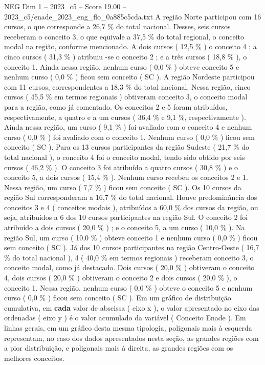 \begin{textsample}{NEG Dim 1 – 2023\_c5 – Score 19.00 – 2023\_c5/enade\_2023\_eng\_flo\_0a885c5cda.txt}
A região Norte participou com 16 cursos, o que corresponde a 26,7 \% do total nacional.
Desses, seis cursos receberam o conceito 3, o que equivale a 37,5 \% do total regional, o conceito modal na região, conforme mencionado.
A dois cursos ( 12,5 \% ) o conceito 4 ; a cinco cursos ( 31,3 \% ) atribuiu -se o conceito 2 ; e a três cursos ( 18,8 \% ), o conceito 1.
Ainda nessa região, nenhum curso ( 0,0 \% ) obteve conceito 5 e nenhum curso ( 0,0 \% ) ficou sem conceito ( SC ).
A região Nordeste participou com 11 cursos, correspondentes a 18,3 \% do total nacional.
Nessa região, cinco cursos ( 45,5 \% em termos regionais ) obtiveram conceito 3, o conceito modal para a região, como já comentado.
Os conceitos 2 e 5 foram atribuídos, respectivamente, a quatro e a um cursos ( 36,4 \% e 9,1 \%, respectivamente ).
Ainda nessa região, um curso ( 9,1 \% ) foi avaliado com o conceito 4 e nenhum curso ( 0,0 \% ) foi avaliado com o conceito 1.
Nenhum curso ( 0,0 \% ) ficou sem conceito ( SC ).
Para os 13 cursos participantes da região Sudeste ( 21,7 \% do total nacional ), o conceito 4 foi o conceito modal, tendo sido obtido por seis cursos ( 46,2 \% ).
O conceito 3 foi atribuído a quatro cursos ( 30,8 \% ) e o conceito 5, a dois cursos ( 15,4 \% ).
Nenhum curso recebeu os conceitos 2 e 1.
Nessa região, um curso ( 7,7 \% ) ficou sem conceito ( SC ).
Os 10 cursos da região Sul corresponderam a 16,7 \% do total nacional.
Houve predominância dos conceitos 3 e 4 ( conceitos modais ), atribuídos a 60,0 \% dos cursos da região, ou seja, atribuídos a 6 dos 10 cursos participantes na região Sul.
O conceito 2 foi atribuído a dois cursos ( 20,0 \% ) ; e o conceito 5, a um curso ( 10,0 \% ).
Na região Sul, um curso ( 10,0 \% ) obteve conceito 1 e nenhum curso ( 0,0 \% ) ficou sem conceito ( SC ).
Já dos 10 cursos participantes na região Centro-Oeste ( 16,7 \% do total nacional ), 4 ( 40,0 \% em termos regionais ) receberam conceito 3, o conceito modal, como já destacado.
Dois cursos ( 20,0 \% ) obtiveram o conceito 4, dois cursos ( 20,0 \% ) obtiveram o conceito 2 e dois cursos ( 20,0 \% ), o conceito 1.
Nessa região, nenhum curso ( 0,0 \% ) obteve o conceito 5 e nenhum curso ( 0,0 \% ) ficou sem conceito ( SC ).
Em um gráfico de distribuição cumulativa, em \textbf{cada} valor de abscissa ( eixo x ), o valor apresentado no eixo das ordenadas ( eixo y ) é o valor acumulado da variável ( Conceito Enade ).
Em linhas gerais, em um gráfico desta mesma tipologia, poligonais mais à esquerda representam, no caso dos dados apresentados nesta seção, as grandes regiões com a pior distribuição, e poligonais mais à direita, as grandes regiões com os melhores conceitos.

\end{textsample}
